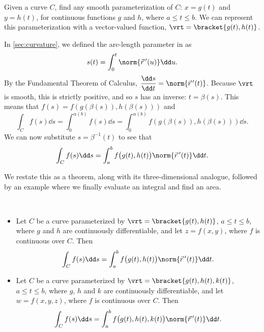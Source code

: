 
Given a curve $C$, find any smooth parameterization of $C$: $x = g(t)$ and $y=h(t)$, for continuous functions $g$ and $h$, where $a\leq t\leq b$. We can represent this parameterization with a vector-valued function, $\vrt =\bracket{g(t),h(t)}$.

In \autoref{sec:curvature}, we defined the arc-length parameter in  as 
\[s(t) = \int_0^t \norm{\vec r\,'(u)}\dd u.\]
By the Fundamental Theorem of Calculus, $\dfrac{\dd s}{\dd t} = \norm{\vec r\,'(t)}$. Because $\vrt$ is smooth, this is strictly positive, and so $s$ has an inverse: $t=\beta(s)$.  This means that $f(s)=f(g(\beta(s)),h(\beta(s)))$ and
%
\[\int_C f(s)\dd s = \int_0^{\alpha(b)} f(s)\dd s = \int_0^{\alpha(b)}f(g(\beta(s)),h(\beta(s)))\dd s. \]
We can now substitute $s=\beta^{-1}(t)$ to see that
\[\int_C f(s)\dd s = \int_a^bf\bigl(g(t),h(t)\bigr)\norm{\vec r\,'(t)}\dd t.\]

We restate this as a theorem, along with its three-dimensional analogue, followed by an example where we finally evaluate an integral and find an area.

\begin{theorem}\label{thm:line1}%
%
\mbox{}\\[-2\baselineskip]\parbox[t]{\linewidth}{\begin{itemize}
	\item Let $C$ be a curve parameterized by $\vrt =\bracket{g(t),h(t)}$, $a\leq t\leq b$, where $g$ and $h$ are continuously differentiable, and let $z=f(x,y)$, where $f$ is continuous over $C$. Then
\[\int_Cf(s)\dd s = \int_a^bf\bigl(g(t),h(t)\bigr)\norm{\vec r\,'(t)}\dd t.\]
	\item Let $C$ be a curve parameterized by $\vrt =\bracket{g(t),h(t),k(t)}$, $a\leq t\leq b$, where $g$, $h$ and $k$ are continuously differentiable, and let $w=f(x,y,z)$, where $f$ is continuous over $C$. Then
\[\int_Cf(s)\dd s = \int_a^bf\bigl(g(t),h(t),k(t)\bigr)\norm{\vec r\,'(t)}\dd t.\]
\end{itemize}}
\end{theorem}

